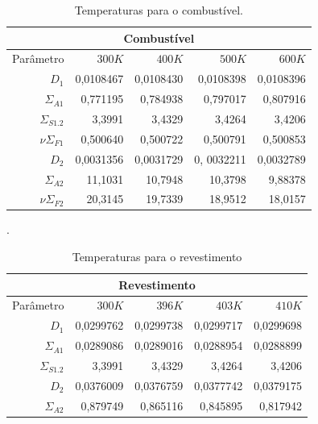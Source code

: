 %

\begin{table}[htb]
  \centering
  \caption[Temperaturas para combustível.]{Temperaturas para o combustível.}
  \label{tab:temp-fuel}
  \begin{tabular}{r r r r r}
  \multicolumn{5}{c}{Combustível} \\
  \hline
  Parâmetro & $300K$ & $400K$ & $500K$ & $600K$ \\
  \hline
  $D_1$ & 0,0108467 & 0,0108430 & 0,0108398 & 0,0108396\\
  $\Sigma_{A1}$ & 0,771195 & 0,784938 & 0,797017 & 0,807916\\
  $\Sigma_{S1.2}$ & 3,3991 & 3,4329 & 3,4264 & 3,4206\\
  $\nu \Sigma_{F1}$ & 0,500640 & 0,500722 & 0,500791 & 0,500853\\
  \hline
  $D_2$ & 0,0031356 & 0,0031729 & 0, 0032211 & 0,0032789 \\
  $\Sigma_{A2}$ & 11,1031 & 10,7948 & 10,3798 & 9,88378\\
  $\nu \Sigma_{F2}$ & 20,3145 & 19,7339 & 18,9512 & 18,0157\\
  \hline
\end{tabular}
\end{table}

\begin{table}[htb]
  \centering
  \caption[Temperaturas para o revestimento.]{Temperaturas para o revestimento}.
  \label{tab:temp-cladding}
  \begin{tabular}{r r r r r}
    \multicolumn{5}{c}{Revestimento} \\
    \hline
    Parâmetro & $300K$ & $396K$ & $403K$ & $410K$ \\
    \hline
    $D_1$ & 0,0299762 & 0,0299738 & 0,0299717 & 0,0299698 \\
    $\Sigma_{A1}$ & 0,0289086 & 0,0289016 & 0,0288954 & 0,0288899 \\
    $\Sigma_{S1.2}$ & 3,3991 & 3,4329 & 3,4264 & 3,4206\\
    \hline
    $D_2$ & 0,0376009 & 0,0376759 & 0,0377742 & 0,0379175\\
    $\Sigma_{A2}$ & 0,879749 & 0,865116 & 0,845895 & 0,817942\\
    \hline
  \end{tabular}
\end{table}

